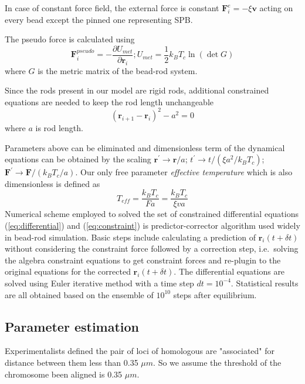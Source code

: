 \documentclass{article}
\begin{document}
In case of constant force field, the external force is constant $\mathbf{F}_i^e = -\xi \mathbf{v}$ acting on every bead except the pinned one representing SPB. 

The pseudo force is calculated using
\begin{equation}
	\mathbf{F}_i^{pseudo} = -\frac{\partial U_{met}}{\partial\mathbf{r}_i}; U_{met} = \frac{1}{2}k_B T_c \ln(\det G)
\end{equation}
where $G$ is the metric matrix of the bead-rod system\cite{Pasquali2002}.

Since the rods present in our model are rigid rods, additional constrained equations are needed to keep the rod length unchangeable
\begin{equation}
	\label{eq:constraint}
	(\mathbf{r}_{i+1} - \mathbf{r}_{i})^2 - a^2 = 0
\end{equation}
where $a$ is rod length.

Parameters above can be eliminated and dimensionless term of the dynamical equations can be obtained by the scaling $\mathbf{r}^{\prime}\to \mathbf{r}/a$; $t^{\prime}\to t/(\xi a^2/k_BT_c)$; $\mathbf{F}^{\prime}\to\mathbf{F}/(k_BT_c/a)$.
Our only free parameter \emph{effective temperature} which is also dimensionless is defined as
\begin{equation}
	\label{eq:Teff}
	T_{eff} = \frac{k_BT_c}{Fa} = \frac{k_B T_c}{\xi v a}
\end{equation}
Numerical scheme employed to solved the set of constrained differential equations (\ref{eq:differential}) and (\ref{eq:constraint}) is predictor-corrector algorithm used widely in bead-rod simulation\cite{Cruz2012,Somasi2002,Liu1989}.
Basic steps include calculating a prediction of $\mathbf{r}_i(t+\delta t)$ without considering the constraint force followed by a correction step, i.e.\ solving the algebra constraint equations to get constraint forces and re-plugin to the original equations for the corrected $\mathbf{r}_i(t+\delta t)$.
The differential equations are solved using Euler iterative method with a time step $dt = 10^{-4}$.  Statistical results are all obtained based on the ensemble of $10^{10}$ steps after equilibrium.  

\subsection{Parameter estimation}
\label{sub:estimation}
Experimentalists defined the pair of loci of homologous are "associated" for distance between them less than 0.35 $\mu m$\cite{Ding2004}. 
So we assume the threshold of the chromosome been aligned is 0.35 $\mu m$.
\end{document}
